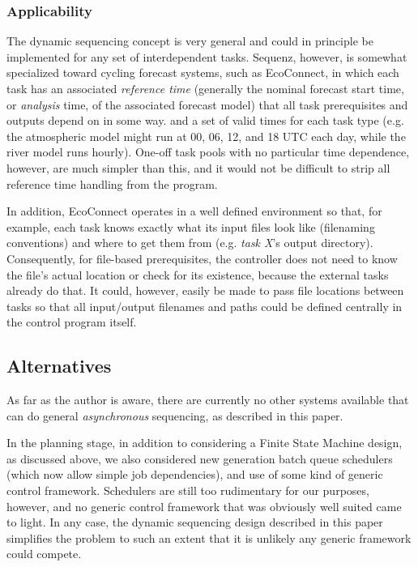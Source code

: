 \documentclass[11pt,a4paper]{article}
\begin{document}
\subsubsection{Applicability}

The dynamic sequencing concept is very general and could in principle be
implemented for any set of interdependent tasks. Sequenz, however, is
somewhat specialized toward cycling forecast systems, such as
EcoConnect, in which each task has an associated {\em reference time}
(generally the nominal forecast start time, or {\em analysis} time, of
the associated forecast model) that all task prerequisites and outputs
depend on in some way. and a set of valid times for each task type (e.g.
the atmospheric model might run at 00, 06, 12, and 18 UTC each day,
while the river model runs hourly).  One-off task pools with no
particular time dependence, however, are much simpler than this, and it
would not be difficult to strip all reference time handling from the
program.

In addition, EcoConnect operates in a well defined environment so that,
for example, each task knows exactly what its input files look like
(filenaming conventions) and where to get them from (e.g. {\em task X}'s
output directory). Consequently, for file-based prerequisites, the
controller does not need to know the file's actual location or check for
its existence, because the external tasks already do that. It could,
however, easily be made to pass file locations between tasks so that all
input/output filenames and paths could be defined centrally in the
control program itself.  


\subsection{Alternatives}

As far as the author is aware, there are currently no other systems
available that can do general {\em asynchronous} sequencing, as
described in this paper.

In the planning stage, in addition to considering a Finite State Machine
design, as discussed above, we also considered new generation batch
queue schedulers (which now allow simple job dependencies), and use of
some kind of generic control framework.  Schedulers are still too
rudimentary for our purposes, however, and no generic control framework
that was obviously well suited came to light. In any case, the dynamic
sequencing design described in this paper simplifies the problem to such
an extent that it is unlikely any generic framework could compete.  
\end{document}
